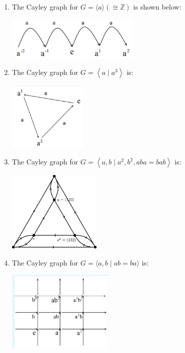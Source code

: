 \begin{example}
\begin{enumerate}
    \item The Cayley graph for \(G = \langle a\rangle \left( { \cong  \mathbb{Z}}\right)\) is shown below:
\begin{center}
\includegraphics[width=0.5\textwidth]{images/Ch6_graph_Z.jpg}
\end{center}


\item The Cayley graph for \(G = \left\langle  {a \mid  {a}^{3}}\right\rangle\) is:

\begin{center}
\includegraphics[width=0.3\textwidth]{images/Ch6_graph_Z3.jpg}
\end{center}

\item The Cayley graph for \(G = \left\langle  {a,b \mid  {a}^{2},{b}^{2},{aba} = {bab}}\right\rangle\) is:

\begin{center}
\includegraphics[width=0.35\textwidth]{images/Ch6_graph_S3.png}
\end{center}

\item The Cayley graph for \(G = \langle a,b \mid  {ab} = {ba}\rangle\) is:

\begin{center}
\includegraphics[width=0.4\textwidth]{images/Ch6_graph_ZZ.jpg}
\end{center}



\end{enumerate}
\end{example}
